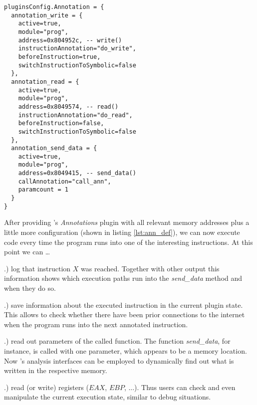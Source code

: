 \bigskip
\begin{lstlisting}[language={[5.0]Lua}, basicstyle=\ttfamily\footnotesize, caption={Configuration of the \textit{Annotations} plugin (part). Defines the instructions to be monitored and actions to trigger upon execution of these instructions. Note the link to the binary in listing \ref{lst:ass} via memory addresses.}, label={lst:ann_def}]
pluginsConfig.Annotation = {
  annotation_write = {
    active=true,
    module="prog",
    address=0x804952c, -- write()
    instructionAnnotation="do_write",
    beforeInstruction=true,
    switchInstructionToSymbolic=false
  },
  annotation_read = {
    active=true,
    module="prog",
    address=0x8049574, -- read()
    instructionAnnotation="do_read",
    beforeInstruction=false, 
    switchInstructionToSymbolic=false
  },
  annotation_send_data = {
    active=true,
    module="prog",
    address=0x8049415, -- send_data()
    callAnnotation="call_ann",
    paramcount = 1
  }
}
\end{lstlisting}
\bigskip


After providing \sse's \textit{Annotations} plugin with all relevant memory addresses plus a little more configuration (shown in listing \ref{lst:ann_def}), we can now execute code every time the program runs into one of the interesting instructions.
At this point we can \ldots

.) log that instruction $X$ was reached.
Together with other \sse output this information shows which execution paths run into the \textit{send\_data} method and when they do so.

.) save information about the executed instruction in the current plugin state.
This allows to check whether there have been prior connections to the internet when the program runs into the next annotated instruction.

.) read out parameters of the called function.
The function \textit{send\_data}, for instance, is called with one parameter, which appears to be a memory location.
Now \sse's analysis interfaces can be employed to dynamically find out what is written in the respective memory.

.) read (or write) registers ($EAX$, $EBP$, ...).
Thus \sse users can check and even manipulate the current execution state, similar to debug situations.

